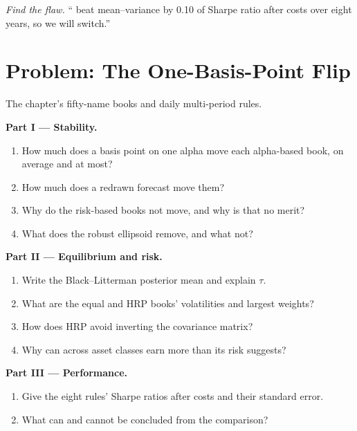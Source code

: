 \begin{exercise}[$\star\star\star$]\label{exo:rs:portfolio-construction-ii:8}
\emph{Find the flaw.} `` beat mean--variance by 0.10 of Sharpe ratio after costs over eight years, so we will switch.''
\end{exercise}

\section{Problem: The One-Basis-Point Flip}

\begin{problem}\label{pb:rs:portfolio-construction-ii:1}
The chapter's fifty-name books and daily multi-period rules.

\medskip\noindent\textbf{Part I --- Stability.}
\begin{enumerate}
\item How much does a basis point on one alpha move each alpha-based book, on average and at most?
\item How much does a redrawn forecast move them?
\item Why do the risk-based books not move, and why is that no merit?
\item What does the robust ellipsoid remove, and what not?
\end{enumerate}

\medskip\noindent\textbf{Part II --- Equilibrium and risk.}
\begin{enumerate}[resume]
\item Write the Black--Litterman posterior mean and explain $\tau$.
\item What are the equal  and HRP books' volatilities and largest weights?
\item How does HRP avoid inverting the covariance matrix?
\item Why can  across asset classes earn more than its risk suggests?
\end{enumerate}

\medskip\noindent\textbf{Part III --- Performance.}
\begin{enumerate}[resume]
\item Give the eight rules' Sharpe ratios after costs and their standard error.
\item What can and cannot be concluded from the comparison?
\end{enumerate}


\end{problem}
